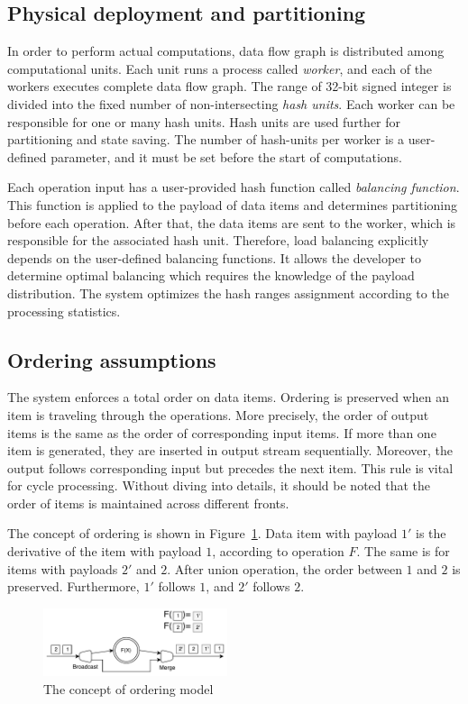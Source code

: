 \subsection{Physical deployment and partitioning}
In order to perform actual computations, data flow graph is distributed among computational units. Each unit runs a process called {\it worker}, and each of the workers executes complete data flow graph. The range of 32-bit signed integer is divided into the fixed number of non-intersecting {\it hash units}. Each worker can be responsible for one or many hash units. Hash units are used further for partitioning and state saving. The number of hash-units per worker is a user-defined parameter, and it must be set before the start of computations. 

Each operation input has a user-provided hash function called {\it balancing function}. This function is applied to the payload of data items and determines partitioning before each operation. After that, the data items are sent to the worker, which is responsible for the associated hash unit. Therefore, load balancing explicitly depends on the user-defined balancing functions. It allows the developer to determine optimal balancing which requires the knowledge of the payload distribution. The system optimizes the hash ranges assignment according to the processing statistics. 

\subsection{Ordering assumptions}
The system enforces a total order on data items. Ordering is preserved when an item is traveling through the operations. More precisely, the order of output items is the same as the order of corresponding input items. If more than one item is generated, they are inserted in output stream sequentially. Moreover, the output follows corresponding input but precedes the next item. This rule is vital for cycle processing. Without diving into details, it should be noted that the order of items is maintained across different fronts.

The concept of ordering is shown in Figure~\ref{ordering}. Data item with payload $1'$ is the derivative of the item with payload $1$, according to operation $F$. The same is for items with payloads $2'$ and $2$. After union operation, the order between $1$ and $2$ is preserved. Furthermore, $1'$ follows $1$, and $2'$ follows $2$.  
\begin{figure}[htbp]
  \centering
  \includegraphics[width=0.48\textwidth]{pics/ordering}
  \caption{The concept of ordering model}
  \label {ordering}
\end{figure}

